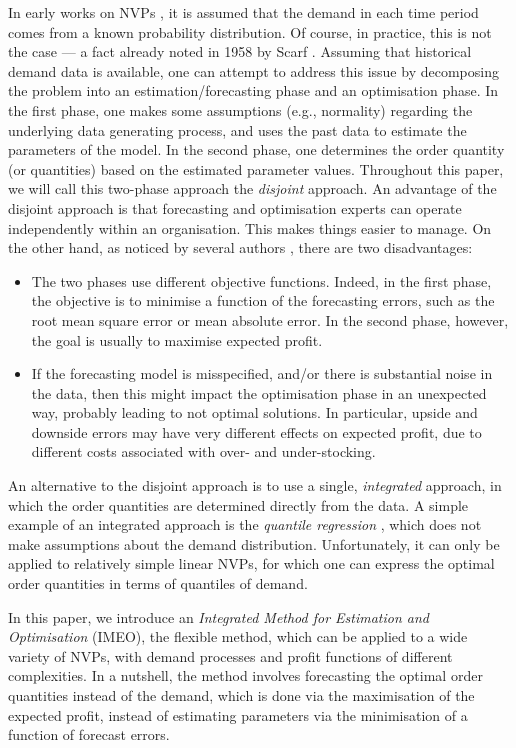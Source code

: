 \documentclass{article}
\begin{document}
In early works on NVPs \cite{AHM51,MK51}, it is assumed that the demand in each time period comes from a known probability distribution. Of course, in practice, this is not the case --- a fact already noted in 1958 by Scarf \cite{Sc58}. Assuming that historical demand data is available, one can attempt to address this issue by decomposing the problem into an estimation/forecasting phase and an optimisation phase. In the first phase, one makes some assumptions (e.g., normality) regarding the underlying data generating process, and uses the past data to estimate the parameters of the model. In the second phase, one determines the order quantity (or quantities) based on the estimated parameter values. Throughout this paper, we will call this two-phase approach the \emph{disjoint} approach. An advantage of the disjoint approach is that forecasting and optimisation experts can operate independently within an organisation. This makes things easier to manage. On the other hand, as noticed by several authors \cite{BT06,BM12,Ka94,KT96,KTB20}, there are two disadvantages:
\begin{itemize}
    \item The two phases use different objective functions. Indeed, in the first phase, the objective is to minimise a function of the forecasting errors, such as the root mean square error or mean absolute error. In the second phase, however, the goal is usually to maximise expected profit.
    \item If the forecasting model is misspecified, and/or there is substantial noise in the data, then this might impact the optimisation phase in an unexpected way, probably leading to not optimal solutions. In particular, upside and downside errors may have very different effects on expected profit, due to different costs associated with over- and under-stocking.
\end{itemize}

An alternative to the disjoint approach is to use a single, \emph{integrated} approach, in which the order quantities are determined directly from the data. A simple example of an integrated approach is the \emph{quantile regression} \cite{Br16,Hu19}, which does not make assumptions about the demand distribution. Unfortunately, it can only be applied to relatively simple linear NVPs, for which one can express the optimal order quantities in terms of quantiles of demand.

In this paper, we introduce an \emph{Integrated Method for Estimation and Optimisation} (IMEO), the flexible method, which can be applied to a wide variety of NVPs, with demand processes and profit functions of different complexities. In a nutshell, the method involves forecasting the optimal order quantities instead of the demand, which is done via the maximisation of the expected profit, instead of estimating parameters via the minimisation of a function of forecast errors.
\end{document}
